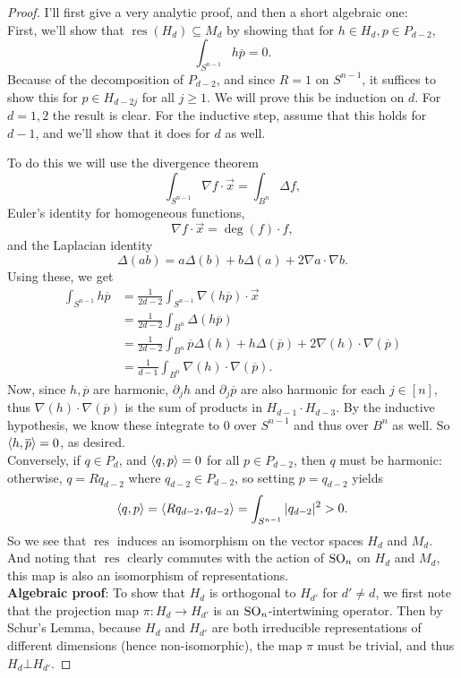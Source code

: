 \documentclass{amsart}
\DeclareMathOperator{\res}{res}
\begin{document}
	\begin{proof}
		I'll first give a very analytic proof, and then a short algebraic one:\\
		
		First, we'll show that $\res(H_d)\subseteq M_d$ by showing that for $h\in H_d,p\in P_{d-2}$, 
		$$
		\int_{S^{n-1}} h\overline{p} = 0.
		$$
		Because of the decomposition of $P_{d-2}$, and since $R=1$ on $S^{n-1}$, it suffices to show this for $p\in H_{d-2j}$ for all $j\geq 1$. We will prove this be induction on $d$. For $d=1,2$ the result is clear. For the inductive step, assume that this holds for $d-1$, and we'll show that it does for $d$ as well.
		
		To do this we will use the divergence theorem
		$$
		\int_{S^{n-1}} \nabla f \cdot \vec{x} = \int_{B^{n}} \Delta f,
		$$
		Euler's identity for homogeneous functions,
		$$
		\nabla f \cdot \vec{x} = \deg(f) \cdot f,
		$$
		and the Laplacian identity
		$$
		\Delta(ab) = a\Delta(b) + b\Delta(a) + 2\nabla a \cdot \nabla b.
		$$
		Using these, we get
		\begin{align*}
		\int_{S^{n-1}} h\overline{p} &= \frac{1}{2d-2} \int_{S^{n-1}} \nabla (h\overline{p}) \cdot \vec{x}\\
		&= \frac{1}{2d-2} \int_{B^{n}} \Delta (h\overline{p})\\
		&= \frac{1}{2d-2} \int_{B^{n}} \overline{p}\Delta (h) + h \Delta(\overline{p}) + 2\nabla(h)\cdot \nabla (\overline{p})\\
		&= \frac{1}{d-1}\int_{B^{n}} \nabla(h)\cdot \nabla (\overline{p}).
		\end{align*}
		Now, since $h,\overline{p}$ are harmonic, $\partial_j h$ and $\partial_j \overline{p}$ are also harmonic for each $j\in [n]$, thus $\nabla(h)\cdot \nabla(\overline{p})$ is the sum of products in $H_{d-1}\cdot H_{d-3}$. By the inductive hypothesis, we know these integrate to $0$ over $S^{n-1}$ and thus over $B^n$ as well. So $\langle h,\overline{p}\rangle=0$, as desired.\\
		
		Conversely, if $q\in P_d$, and $\langle q,p\rangle=0$ for all $p\in P_{d-2}$, then $q$ must be harmonic: otherwise, $q=Rq_{d-2}$ where $q_{d-2}\in P_{d-2}$, so setting $p=q_{d-2}$ yields
		$$
		\langle q,p\rangle = \langle Rq_{d-2},q_{d-2}\rangle = \int_{S^{n-1}} |q_{d-2}|^2 > 0.
		$$
		So we see that $\res$ induces an isomorphism on the vector spaces $H_d$ and $M_d$. And noting that $\res$ clearly commutes with the action of $\operatorname{SO}_n$ on $H_d$ and $M_d$, this map is also an isomorphism of representations.\\
		
		\textbf{Algebraic proof}: To show that $H_d$ is orthogonal to $H_{d'}$ for $d'\neq d$, we first note that the projection map $\pi: H_d\to H_{d'}$ is an $\operatorname{SO}_n$-intertwining operator. Then by Schur's Lemma, because $H_d$ and $H_{d'}$ are both irreducible representations of different dimensions (hence non-isomorphic), the map $\pi$ must be trivial, and thus $H_d\bot H_{d'}$.
	\end{proof}
	
\end{document}
